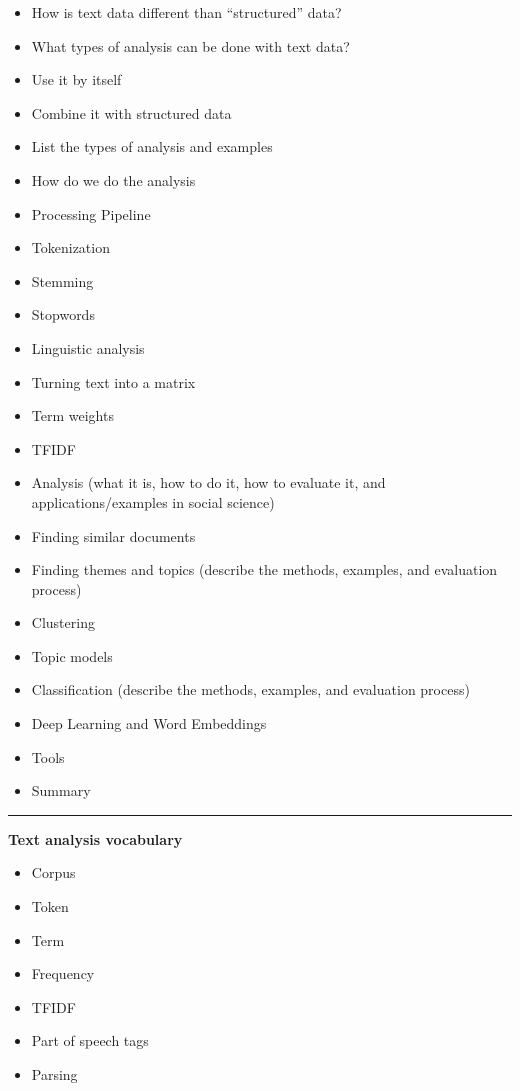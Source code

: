\documentclass[]{krantz}
\providecommand{\tightlist}{%
  \setlength{\itemsep}{0pt}\setlength{\parskip}{0pt}}
\begin{document}
\begin{itemize}
\tightlist
\item
  How is text data different than ``structured'' data?
\item
  What types of analysis can be done with text data?
\item
  Use it by itself
\item
  Combine it with structured data
\item
  List the types of analysis and examples
\item
  How do we do the analysis
\item
  Processing Pipeline
\item
  Tokenization
\item
  Stemming
\item
  Stopwords
\item
  Linguistic analysis
\item
  Turning text into a matrix
\item
  Term weights
\item
  TFIDF
\item
  Analysis (what it is, how to do it, how to evaluate it, and
  applications/examples in social science)
\item
  Finding similar documents
\item
  Finding themes and topics (describe the methods, examples, and
  evaluation process)
\item
  Clustering
\item
  Topic models
\item
  Classification (describe the methods, examples, and evaluation
  process)
\item
  Deep Learning and Word Embeddings
\item
  Tools
\item
  Summary
\end{itemize}

\begin{center}\rule{0.5\linewidth}{\linethickness}\end{center}

\textbf{Text analysis vocabulary}

\begin{itemize}
\tightlist
\item
  Corpus
\item
  Token
\item
  Term
\item
  Frequency
\item
  TFIDF
\item
  Part of speech tags
\item
  Parsing
\end{itemize}
\end{document}
